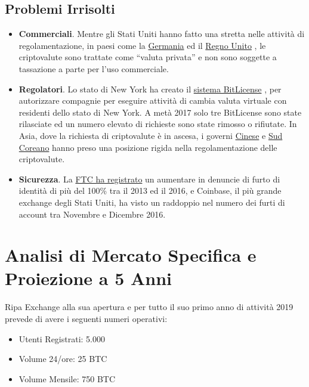 \documentclass[11pt,fleqn]{book} %
\begin{document}
	\subsection{Problemi Irrisolti}
		\begin{itemize}
			\item \textbf{Commerciali}. Mentre gli Stati Uniti hanno fatto una stretta nelle
			attività di regolamentazione, in paesi come la 
			\href{https://techcrunch.com/2013/08/19/germany-recognizes-bitcoin-as-private-money-sales-tax-coming-soon/}{Germania} 
			\cite{techCrunchPrivateMoney}
			ed il \href{http://www.ibtimes.co.uk/hmrc-re-classify-bitcoin-private-money-1432718}{Regno Unito}
			\cite{ibtimesPrivateMoney},
			le criptovalute sono trattate come ``valuta privata'' e non sono soggette a tassazione a parte per l'uso commerciale.
			\item \textbf{Regolatori}. Lo stato di New York ha creato il 
			\href{https://www.wired.com/2014/07/ny_bitcoin/}{sistema BitLicense}
			\cite{wiredNYLicense}, per autorizzare
			compagnie per eseguire attività di cambia valuta virtuale con residenti dello stato di New York.
			A metà 2017 solo tre BitLicense sono state rilasciate ed un numero elevato di richieste sono
			state rimosso o rifiutate. In Asia, dove la richiesta di criptovalute è in ascesa,
			i governi \href{http://fortune.com/2018/01/17/china-bitcoin-cryptocurrency-crackdown/}{Cinese}
			\cite{fortune}
			e \href{https://www.bloomberg.com/news/articles/2017-12-13/south-korea-seeks-measures-to-curb-frenzied-bitcoin-speculation}{Sud Coreano} 
			\cite{bloombergSKBan}
			hanno preso una posizione rigida nella regolamentazione delle criptovalute.
			\item \textbf{Sicurezza}. La 
			\href{https://www.forbes.com/sites/laurashin/2016/12/20/hackers-have-stolen-millions-of-dollars-in-bitcoin-using-only-phone-numbers/#3ac0bf1d38ba}{FTC ha registrato}
			\cite{forbesBitcoinHacking} 
			un aumentare in denuncie di furto di identità di più del 100\% tra il 2013 ed il 2016,
			e Coinbase, il più grande exchange degli Stati Uniti, ha visto un raddoppio nel numero dei furti di 
			account tra Novembre e Dicembre 2016.
		\end{itemize}

\section{Analisi di Mercato Specifica e Proiezione a 5 Anni}
Ripa Exchange alla sua apertura e per tutto il suo primo anno di attività 2019 prevede di avere i 
seguenti numeri operativi:
\begin{itemize}
	\item Utenti Registrati: 	5.000			%
	\item Volume 24/ore: 		25 BTC			%
	\item Volume Mensile: 		750 BTC			%
\end{itemize}
\end{document}
